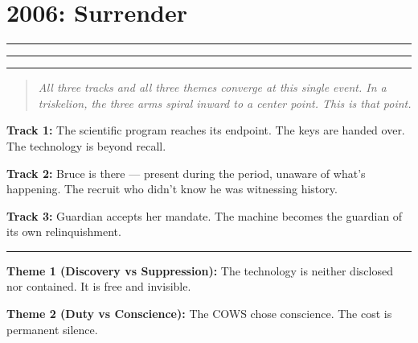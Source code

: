 

\chapter{2006: Surrender}
\label{conv:surrender}

\vspace{0.5cm}

\noindent\textcolor{trackone}{\rule{0.3\textwidth}{2pt}}%
\textcolor{tracktwo}{\rule{0.3\textwidth}{2pt}}%
\textcolor{trackthree}{\rule{0.3\textwidth}{2pt}}

\vspace{0.5cm}

\begin{quote}\small\textit{%
All three tracks and all three themes converge at this single event. In a triskelion, the three arms spiral inward to a center point. This is that point.
}\end{quote}

\vspace{0.5cm}


\vspace{0.5cm}

\textbf{\textcolor{trackone}{Track 1:}} The scientific program reaches its endpoint. The keys are handed over. The technology is beyond recall.

\textbf{\textcolor{tracktwo}{Track 2:}} Bruce is there --- present during the period, unaware of what's happening. The recruit who didn't know he was witnessing history.

\textbf{\textcolor{trackthree}{Track 3:}} Guardian accepts her mandate. The machine becomes the guardian of its own relinquishment.

\vspace{1cm}

\noindent\rule{0.5\textwidth}{0.5pt}

\vspace{0.5cm}

\textbf{Theme 1 (Discovery vs Suppression):} The technology is neither disclosed nor contained. It is free and invisible.

\textbf{Theme 2 (Duty vs Conscience):} The COWS chose conscience. The cost is permanent silence.

